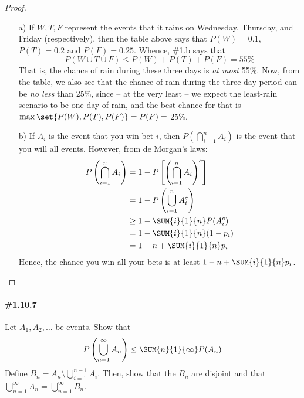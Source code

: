 \documentclass[12pt,titlepage]{article}
\begin{document}
\begin{proof}
\begin{enumerate}
\item[a)] If $W,T,F$ represent the events that it rains on Wednesday, Thursday, and Friday (respectively), then the table above says that $P(W) = 0.1$, $P(T) = 0.2$ and $P(F) = 0.25$. Whence, \#1.b says that 
\[
P(W \cup T \cup F) \leq P(W) + P(T) + P(F) = 55\%
\]
That is, the chance of rain during these three days is \textit{at most} 55\%. Now, from the table, we also see that the chance of rain during the three day period can be \textit{no less} than 25\%, since -- at the very least -- we expect the least-rain scenario to be one day of rain, and the best chance for that is $\max\set{P(W),P(T),P(F)} = P(F) =$ 25\%.

\item[b)] If $A_i$ is the event that you win bet $i$, then $P(\bigcap_{i=1}^{n} A_i)$ is the event that you will all events. However, from de Morgan's laws:
\begin{align*}
P\left(\bigcap_{i=1}^{n} A_i\right) &= 1- P\left[ \left( \bigcap_{i=1}^{n} A_i\right)^{c} \right] \\
&= 1- P\left( \bigcup_{i=1}^{n} A_{i}^{c} \right) \\
&\geq 1 - \SUM{i}{1}{n} P(A_i^c) \\
&= 1 - \SUM{i}{1}{n} (1-p_i) \\
&= 1 - n + \SUM{i}{1}{n} p_{i} 
\end{align*}
Hence, the chance you win all your bets is at least $1-n + \SUM{i}{1}{n} p_i$. 
\end{enumerate}
\end{proof}

\paragraph{\#1.10.7} Let $A_1, A_2, \ldots$ be events. Show that
\[
P\left( \bigcup_{n=1}^{\infty} A_n \right) \leq \SUM{n}{1}{\infty} P(A_n)
\]
\Hint Define $B_n = A_n \setminus \bigcup_{i=1}^{n-1} A_i$. Then, show that the $B_n$ are disjoint and that $\bigcup_{n=1}^{\infty} A_n = \bigcup_{n=1}^{\infty} B_n$. 
\end{document}
